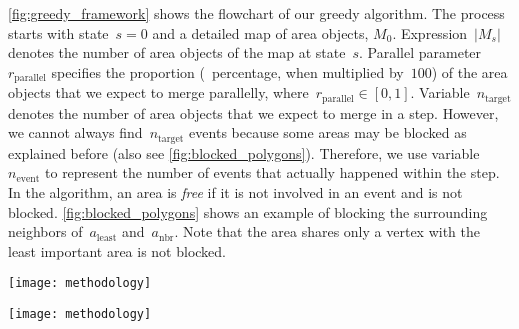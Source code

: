 \documentclass{ica}
\begin{document}
\fig\ref{fig:greedy_framework} shows the flowchart of our greedy algorithm.
The process starts with state~$s=0$ and a detailed map of area objects, $M_0$.
Expression~$|M_s|$ denotes the number of area objects of the map at state~$s$.
Parallel parameter~$r_\mathrm{parallel}$ specifies 
the proportion (\ie~percentage, when multiplied by~$100$) 
of the area objects that
we expect to merge parallelly,
where~$r_\mathrm{parallel} \in [0,1]$.
Variable~$n_\mathrm{target}$ denotes the number of area objects
that we expect to merge in a step.
However,
we cannot always find~$n_\mathrm{target}$ events
because some areas may be blocked as explained before
(also see \fig\ref{fig:blocked_polygons}).
Therefore, we use variable~$n_\mathrm{event}$
to represent the number of events that actually happened within the step. 
In the algorithm, an area is \emph{free} if 
it is not involved in an event and is not blocked.
\fig\ref{fig:blocked_polygons} shows an example of blocking
the surrounding neighbors of~$a_\mathrm{least}$ and~$a_\mathrm{nbr}$.
Note that the area shares only a vertex 
with the least important area is not blocked.




\begin{figure*}[tb]
\centering
\texttt{[image: methodology]}
\caption{The flowchart of our greedy algorithm.
}
\label{fig:greedy_framework}
\end{figure*}


\begin{figure*}[tb]
\centering
\texttt{[image: methodology]}
\caption{The process of finding parallel merging events for a step.
    (a) From all the free areas,
	the least important one is selected to merge into
	its most compatible neighbor.
	Then the surrounding areas are blocked (marked by the crosses).
	(b) Next, the least important area from the remaining free areas
	is selected to merge with the most compatible neighbor,
	and the surrounding areas are also blocked.
}
\label{fig:blocked_polygons}
\end{figure*}
\end{document}
